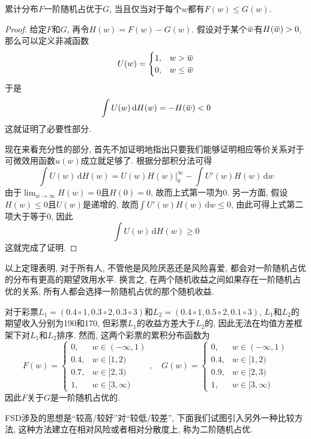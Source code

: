 \documentclass[cn, 12pt, math=mtpro2, bibstyle=apa, blue]{elegantbook}
\newcommand{\overbar}[1]{\mkern 1.5mu\overline{\mkern-1.5mu#1\mkern-1.5mu}\mkern 1.5mu}
\begin{document}
\begin{theorem}
  累计分布$F$一阶随机占优于$G$, 当且仅当对于每个$w$都有$F(w)\leq G(w)$.
\end{theorem}
\begin{proof}
  给定$F$和$G$, 再令$H(w)=F(w)-G(w)$. 假设对于某个$\overbar{w}$有$H(\overbar{w})>0$, 那么可以定义非减函数
  $$U(w)=\begin{cases}
           1, & w>\overbar{w} \\
           0, & w\leq\overbar{w}
         \end{cases}$$
  于是
  $$\int U(w)\,\text{d}H(w)=-H(\overbar{w})<0$$
  这就证明了必要性部分.

  现在来看充分性的部分, 首先不加证明地指出只要我们能够证明相应等价关系对于可微效用函数$u(w)$成立就足够了. 根据分部积分法可得
  $$\int U(w)\,\text{d}H(w)=\left.U(w)H(w)\right|_0^\infty-\int U'(w)H(w)\,\text{d}w$$
  由于$\displaystyle \lim_{w\to\infty}H(w)=0$且$H(0)=0$, 故而上式第一项为0. 另一方面, 假设$H(w)\leq0$且$U(w)$是递增的, 故而$\int U'(w)H(w)\,\text{d}w\leq0$, 由此可得上式第二项大于等于0, 因此
  $$\int U(w)\,\text{d}H(w)\ge0$$
  这就完成了证明.
\end{proof}
以上定理表明, 对于所有人, 不管他是风险厌恶还是风险喜爱, 都会对一阶随机占优的分布有更高的期望效用水平. 换言之, 在两个随机收益之间如果存在一阶随机占优的关系, 所有人都会选择一阶随机占优的那个随机收益.
\begin{example}
对于彩票$L_1=(0.4\circ 1, 0.3\circ 2, 0.3\circ 3)$和$L_2=(0.4\circ 1, 0.5\circ2, 0.1\circ 3)$, $L_1$和$L_2$的期望收入分别为190和170, 但彩票$L_1$的收益方差大于$L_2$的, 因此无法在均值方差框架下对$L_1$和$L_2$排序. 然而, 这两个彩票的累积分布函数为
$$F(w)=\begin{cases}
         0, & w\in (-\infty,1) \\
         0.4, & w\in [1,2) \\
         0.7, & w\in [2,3) \\
         1, & w\in[3,\infty)
       \end{cases},\quad G(w)=\begin{cases}
         0, & w\in (-\infty,1) \\
         0.4, & w\in [1,2) \\
         0.9, & w\in [2,3) \\
         1, & w\in[3,\infty)
       \end{cases}$$
因此$F$关于$G$是一阶随机占优的.
\end{example}

FSD涉及的思想是“较高/较好”对“较低/较差”, 下面我们试图引入另外一种比较方法, 这种方法建立在相对风险或者相对分散度上, 称为二阶随机占优.
\end{document}
